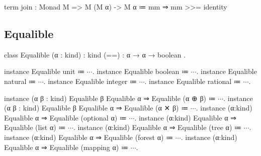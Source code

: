 \begin{program}
term join : Monad M => M (M α) -> M α
  ≔ mm ⇒ mm >>= identity
\end{program}

\subsection{Equalible}

\begin{program}[caption={Equalible}]
class Equalible (α : kind) : kind
  { (==) : α → α → boolean }.
\end{program}
\begin{program}[caption={Equalible instances}]
instance Equalible unit ≔ {$\cdots$}.
instance Equalible boolean ≔ {$\cdots$}.
instance Equalible natural ≔ {$\cdots$}.
instance Equalible integer ≔ {$\cdots$}.
instance Equalible rational ≔ {$\cdots$}.

instance (α β : kind) {Equalible β} {Equalible α} ⇒ Equalible (α ⊕ β)
  ≔ {$\cdots$}.
instance (α β : kind) {Equalible β} {Equalible α} ⇒ Equalible (α ✕ β)
  ≔ {$\cdots$}.
instance (α:kind) {Equalible α} ⇒ Equalible (optional α) ≔ {$\cdots$}.
instance (α:kind) {Equalible α} ⇒ Equalible (list α) ≔ {$\cdots$}.
instance (α:kind) {Equalible α} ⇒ Equalible (tree α) ≔ {$\cdots$}.
instance (α:kind) {Equalible α} ⇒ Equalible (forest α) ≔ {$\cdots$}.
instance (α:kind) {Equalible α} ⇒ Equalible (mapping α) ≔ {$\cdots$}.
\end{program}


%
%
